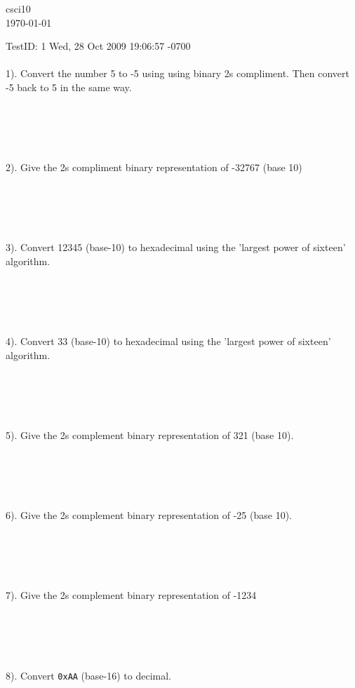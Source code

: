 \documentclass[fleqn]{article}
\begin{document}
\begin{flushleft}
csci10\\
\today
\end{flushleft}
TestID: 1
Wed, 28 Oct 2009 19:06:57 -0700
\\
\\

1).  Convert the number 5 to -5 using using binary 2s compliment.
Then convert -5 back to 5 in the same way.
\begin{verbatim}





\end{verbatim}

2).  Give the 2s compliment binary representation of -32767 (base 10)
\begin{verbatim}





\end{verbatim}

3).  Convert 12345 (base-10) to hexadecimal using the 'largest power of sixteen' algorithm.
\begin{verbatim}





\end{verbatim}

4).  Convert 33 (base-10) to hexadecimal using the 'largest power of sixteen' algorithm.
\begin{verbatim}





\end{verbatim}

5).  Give the 2s complement binary representation of 321 (base 10).
\begin{verbatim}





\end{verbatim}

6).  Give the 2s complement binary representation of -25 (base 10).
\begin{verbatim}





\end{verbatim}

7).  Give the 2s complement binary representation of -1234
\begin{verbatim}





\end{verbatim}

8).  Convert \verb+0xAA+ (base-16) to decimal.
\begin{verbatim}


\end{verbatim}
\end{document}
